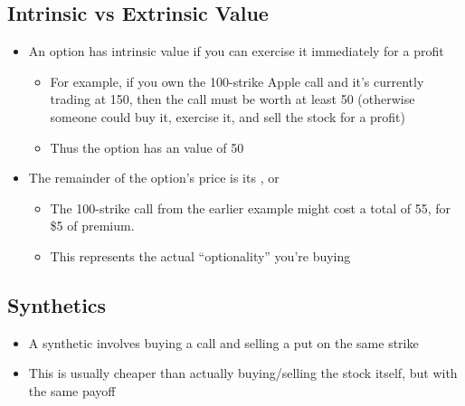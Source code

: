 \subsection{Intrinsic vs Extrinsic Value}%
\label{sub:Intrinsic vs Extrinsic Value}
\begin{itemize}
    \item An option has intrinsic value if you can exercise it immediately for a profit
        \begin{itemize}
            \item For example, if you own the 100-strike Apple call and it's currently trading at 150, then the call must be worth at least 50 (otherwise someone could buy it, exercise it, and sell the stock for a profit)
            \item Thus the option has an  value of 50
        \end{itemize}
    \item The remainder of the option's price is its , or 
        \begin{itemize}
            \item The 100-strike call from the earlier example might cost a total of 55, for \$5 of premium.
            \item This represents the actual ``optionality'' you're buying
        \end{itemize}
\end{itemize}

\subsection{Synthetics}%
\label{sub:Synthetics}
\begin{itemize}
    \item A synthetic involves buying a call and selling a put on the same strike
    \item This is usually cheaper than actually buying/selling the stock itself, but with the same payoff
\end{itemize}

